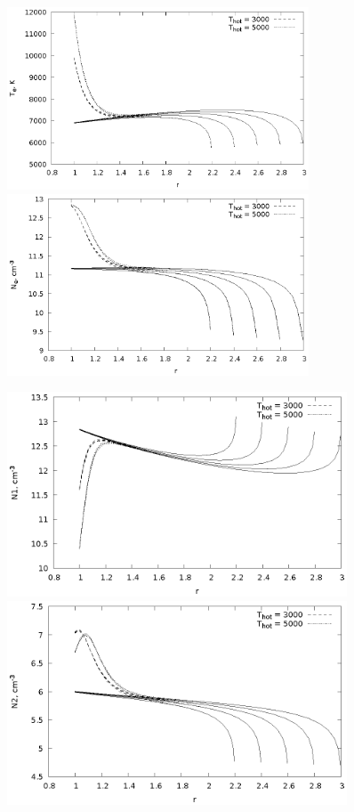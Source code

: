 \documentclass{article}
\begin{document}
\begin{figure}[!h]
\centering
\includegraphics[width=0.8\textwidth]{T_e.eps}
\includegraphics[width=0.8\textwidth]{N_e.eps}
\caption{\rm}
\label{fig:TeNe}
\end{figure}

\begin{figure}[!h]
\centering
\includegraphics[width=0.9\textwidth]{N1.eps}
\includegraphics[width=0.9\textwidth]{N2.eps}
\caption{\rm}
\label{fig:N1N2}
\end{figure}
\end{document}
